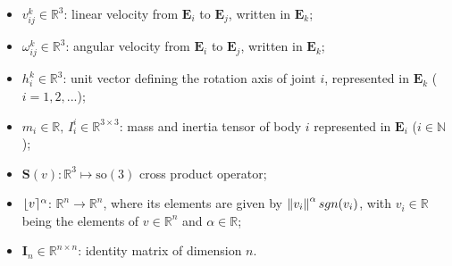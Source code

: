 \begin{itemize}
%
\item $v^{k}_{ij} \in \mathbb{R}^{3}$: linear velocity from $\mathbf{E}_i$ to  $\mathbf{E}_{j}$, written in $\mathbf{E}_k$;
%
\item $\omega^{k}_{ij} \in \mathbb{R}^{3}$: angular velocity from $\mathbf{E}_i$ to $\mathbf{E}_{j}$, written in $\mathbf{E}_k$;
%
%
%
\item $h^{k}_{i} \in \mathbb{R}^{3}$: unit vector defining the rotation axis of joint $i$, represented in $\mathbf{E}_k$ ($i = 1,2,...$);
%

\item $m_i \in \mathbb{R} ,\, I^{i}_{i} \in \mathbb{R}^{3 \times 3}$: mass and inertia tensor of body $i$ represented in $\mathbf{E}_{i}$ ($i \in \mathbb{N}$);
%
\item $\mathbf{S}(v) : \mathbb{R}^3 \mapsto \mathrm{so}(3)$ cross product operator;
%
\item $\lfloor v \rceil^{\alpha}$: $\mathbb{R}^n \rightarrow \mathbb{R}^n$, where its elements are given by $\left\lVert v_i\right\rVert^{\alpha}sgn(v_i)$, with $v_i \in \mathbb{R}$ being the elements of $v \in \mathbb{R}^n$ and $\alpha \in \mathbb{R}$;
%
\item $\mathbf{I}_{n} \in \mathbb{R}^{n \times n}$: identity matrix of dimension $n$.
%
\end{itemize}
